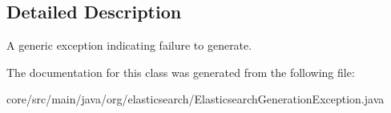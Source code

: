 \subsection{Detailed Description}
A generic exception indicating failure to generate. 

The documentation for this class was generated from the following file\+:\begin{DoxyCompactItemize}
\item 
core/src/main/java/org/elasticsearch/Elasticsearch\+Generation\+Exception.\+java\end{DoxyCompactItemize}
